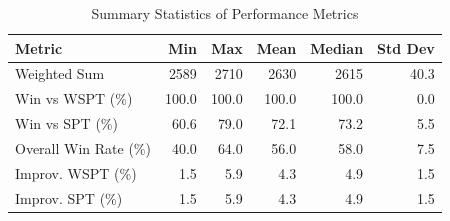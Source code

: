 \begin{table}[htbp]%
\centering%
\begin{tabular}{lrrrrr}%
\toprule%
\textbf{Metric}&\textbf{Min}&\textbf{Max}&\textbf{Mean}&\textbf{Median}&\textbf{Std Dev}\\%
\midrule%
Weighted Sum&2589&2710&2630&2615&40.3\\%
Win vs WSPT (\%)&100.0&100.0&100.0&100.0&0.0\\%
Win vs SPT (\%)&60.6&79.0&72.1&73.2&5.5\\%
Overall Win Rate (\%)&40.0&64.0&56.0&58.0&7.5\\%
Improv. WSPT (\%)&1.5&5.9&4.3&4.9&1.5\\%
Improv. SPT (\%)&1.5&5.9&4.3&4.9&1.5\\%
\bottomrule%
\end{tabular}%
\caption{Summary Statistics of Performance Metrics}%
\label{tab:metrics}%
\end{table}